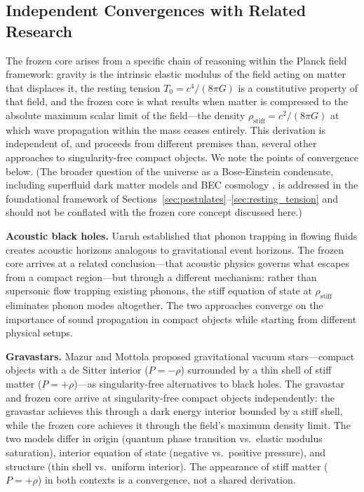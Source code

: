\documentclass[11pt,a4paper]{article}
\newcommand{\rhostiff}{\ensuremath{\rho_{\mathrm{stiff}}}}
\newcommand{\Tzero}{\ensuremath{T_0}}
\theoremstyle{definition}
\theoremstyle{remark}
\begin{document}
\subsection{Independent Convergences with Related Research}
\label{sec:related_frameworks}

The frozen core arises from a specific chain of reasoning within the Planck field framework: gravity is the intrinsic elastic modulus of the field acting on matter that displaces it, the resting tension $\Tzero = c^4/(8\pi G)$ is a constitutive property of that field, and the frozen core is what results when matter is compressed to the absolute maximum scalar limit of the field---the density $\rhostiff = c^2/(8\pi G)$ at which wave propagation within the mass ceases entirely. This derivation is independent of, and proceeds from different premises than, several other approaches to singularity-free compact objects. We note the points of convergence below. (The broader question of the universe as a Bose-Einstein condensate, including superfluid dark matter models \cite{Berezhiani2015} and BEC cosmology \cite{Chavanis2015}, is addressed in the foundational framework of Sections~\ref{sec:postulates}--\ref{sec:resting_tension} and should not be conflated with the frozen core concept discussed here.)

\textbf{Acoustic black holes.} Unruh \cite{Unruh1981} established that phonon trapping in flowing fluids creates acoustic horizons analogous to gravitational event horizons. The frozen core arrives at a related conclusion---that acoustic physics governs what escapes from a compact region---but through a different mechanism: rather than supersonic flow trapping existing phonons, the stiff equation of state at $\rhostiff$ eliminates phonon modes altogether. The two approaches converge on the importance of sound propagation in compact objects while starting from different physical setups.

\textbf{Gravastars.} Mazur and Mottola \cite{MazurMottola2004} proposed gravitational vacuum stars---compact objects with a de Sitter interior ($P = -\rho$) surrounded by a thin shell of stiff matter ($P = +\rho$)---as singularity-free alternatives to black holes. The gravastar and frozen core arrive at singularity-free compact objects independently: the gravastar achieves this through a dark energy interior bounded by a stiff shell, while the frozen core achieves it through the field's maximum density limit. The two models differ in origin (quantum phase transition vs.\ elastic modulus saturation), interior equation of state (negative vs.\ positive pressure), and structure (thin shell vs.\ uniform interior). The appearance of stiff matter ($P = +\rho$) in both contexts is a convergence, not a shared derivation.
\end{document}
